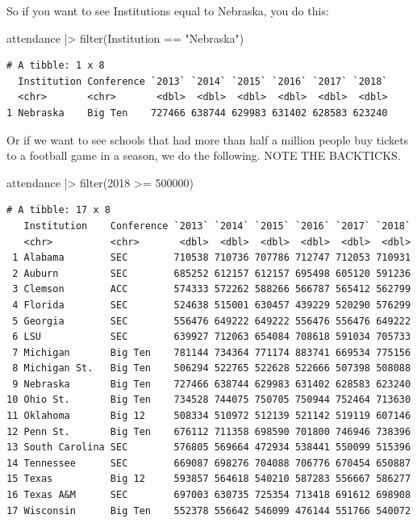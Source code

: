\documentclass[
  letterpaper,
  DIV=11,
  numbers=noendperiod]{scrreprt}
\newenvironment{Shaded}{\begin{snugshade}}{\end{snugshade}}
\newcommand{\AttributeTok}[1]{\textcolor[rgb]{0.40,0.45,0.13}{#1}}
\newcommand{\DecValTok}[1]{\textcolor[rgb]{0.68,0.00,0.00}{#1}}
\newcommand{\FunctionTok}[1]{\textcolor[rgb]{0.28,0.35,0.67}{#1}}
\newcommand{\NormalTok}[1]{\textcolor[rgb]{0.00,0.23,0.31}{#1}}
\newcommand{\SpecialCharTok}[1]{\textcolor[rgb]{0.37,0.37,0.37}{#1}}
\newcommand{\StringTok}[1]{\textcolor[rgb]{0.13,0.47,0.30}{#1}}
\begin{document}
So if you want to see Institutions equal to Nebraska, you do this:

\begin{Shaded}
\begin{Highlighting}[]
\NormalTok{attendance }\SpecialCharTok{|\textgreater{}} \FunctionTok{filter}\NormalTok{(Institution }\SpecialCharTok{==} \StringTok{"Nebraska"}\NormalTok{)}
\end{Highlighting}
\end{Shaded}

\begin{verbatim}
# A tibble: 1 x 8
  Institution Conference `2013` `2014` `2015` `2016` `2017` `2018`
  <chr>       <chr>       <dbl>  <dbl>  <dbl>  <dbl>  <dbl>  <dbl>
1 Nebraska    Big Ten    727466 638744 629983 631402 628583 623240
\end{verbatim}

Or if we want to see schools that had more than half a million people
buy tickets to a football game in a season, we do the following. NOTE
THE BACKTICKS.

\begin{Shaded}
\begin{Highlighting}[]
\NormalTok{attendance }\SpecialCharTok{|\textgreater{}} \FunctionTok{filter}\NormalTok{(}\StringTok{\textasciigrave{}}\AttributeTok{2018}\StringTok{\textasciigrave{}} \SpecialCharTok{\textgreater{}=} \DecValTok{500000}\NormalTok{)}
\end{Highlighting}
\end{Shaded}

\begin{verbatim}
# A tibble: 17 x 8
   Institution    Conference `2013` `2014` `2015` `2016` `2017` `2018`
   <chr>          <chr>       <dbl>  <dbl>  <dbl>  <dbl>  <dbl>  <dbl>
 1 Alabama        SEC        710538 710736 707786 712747 712053 710931
 2 Auburn         SEC        685252 612157 612157 695498 605120 591236
 3 Clemson        ACC        574333 572262 588266 566787 565412 562799
 4 Florida        SEC        524638 515001 630457 439229 520290 576299
 5 Georgia        SEC        556476 649222 649222 556476 556476 649222
 6 LSU            SEC        639927 712063 654084 708618 591034 705733
 7 Michigan       Big Ten    781144 734364 771174 883741 669534 775156
 8 Michigan St.   Big Ten    506294 522765 522628 522666 507398 508088
 9 Nebraska       Big Ten    727466 638744 629983 631402 628583 623240
10 Ohio St.       Big Ten    734528 744075 750705 750944 752464 713630
11 Oklahoma       Big 12     508334 510972 512139 521142 519119 607146
12 Penn St.       Big Ten    676112 711358 698590 701800 746946 738396
13 South Carolina SEC        576805 569664 472934 538441 550099 515396
14 Tennessee      SEC        669087 698276 704088 706776 670454 650887
15 Texas          Big 12     593857 564618 540210 587283 556667 586277
16 Texas A&M      SEC        697003 630735 725354 713418 691612 698908
17 Wisconsin      Big Ten    552378 556642 546099 476144 551766 540072
\end{verbatim}
\end{document}
